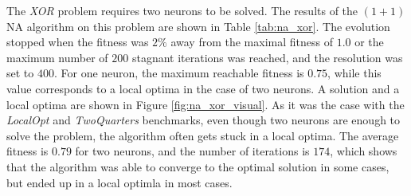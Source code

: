 The \textit{XOR} problem requires two neurons to be solved. The results of the $(1 + 1)$ NA algorithm on this problem are shown in Table \ref{tab:na_xor}. The evolution stopped
when the fitness was $2\%$ away from the maximal fitness of $1.0$ or the maximum number of $200$ stagnant iterations was reached, and the resolution was set to $400$.
For one neuron, the maximum reachable fitness is $0.75$, while this value corresponds to a local optima in the case of two neurons. A solution and a local optima are shown in Figure \ref{fig:na_xor_visual}.
As it was the case with the \textit{LocalOpt} and \textit{TwoQuarters} benchmarks, even though two neurons are enough to solve the problem, the algorithm often gets stuck in a local optima.
The average fitness is $0.79$ for two neurons, and the number of iterations is $174$, which shows that the algorithm was able to converge to the optimal solution in some cases, but ended up in a local optimla
in most cases.


